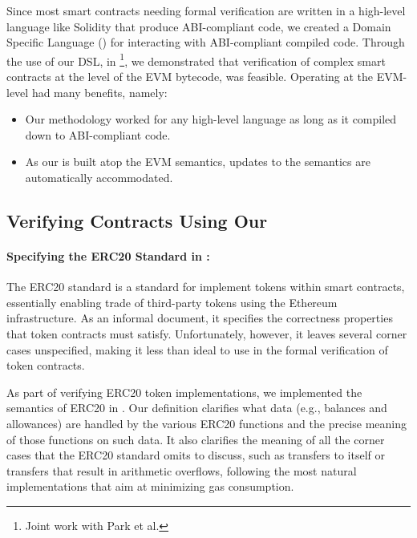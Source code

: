 Since most smart contracts needing formal verification are written in a high-level
language like Solidity \cite{SolidityUrl} that produce ABI-compliant code, we
created a Domain Specific Language (\DSL{}) for interacting with ABI-compliant compiled
code. Through the use of our DSL, in \cite{ParkFSE18} \footnote{Joint work with Park et al.},
we demonstrated that verification of complex smart contracts at the level of the
EVM bytecode, was feasible. Operating at the EVM-level had many benefits,
namely:
\begin{itemize}
  \item Our methodology worked for any high-level language as long as it
    compiled down to ABI-compliant code.
  \item As our \DSL{} is built atop the EVM semantics, updates to the semantics
    are automatically accommodated.
\end{itemize}


\subsection{Verifying Contracts Using Our \DSL{}}\label{sec:verifying-contracts-dsl}

\paragraph{Specifying the ERC20 Standard in \K{}:}
The ERC20 standard \cite{ERC20Url} is a standard for implement tokens within
smart contracts, essentially enabling trade of third-party tokens using the
Ethereum infrastructure.
As an informal document, it specifies the correctness properties that
token contracts must satisfy.
Unfortunately, however, it leaves several corner cases unspecified,
making it less than ideal to use in the formal verification of token contracts. %

As part of verifying ERC20 token implementations, we implemented the semantics
of ERC20 in \K{}. Our definition
clarifies what data
(e.g., balances and allowances) are handled by the various ERC20 functions
and the precise meaning of those functions on such data.
It also clarifies the meaning of all the corner cases that the ERC20 standard omits to discuss,
such as transfers to itself or transfers that result in arithmetic overflows,
following the most natural implementations that aim at minimizing gas consumption.


